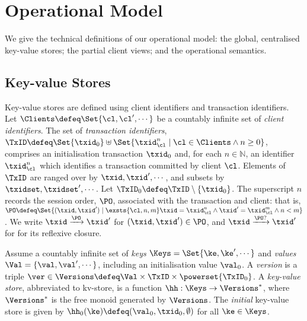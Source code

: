 \section{Operational Model}
\label{sec:model}


We give the technical definitions of our operational model: 
the global, centralised key-value stores; the partial client views;  and the
operational semantics. 

\subsection{Key-value Stores}

Key-value stores are defined using client identifiers and transaction identifiers.
Let $\Clients \defeq \Set{\cl, \cl',\cdots}$ be a 
countably infinite set of \emph{client identifiers}. 
The set of \emph{transaction identifiers}, 
$\TxID \defeq  \Set{\txid_{0}} \uplus \Set{ \txid_{\cl}^{n} \mid \cl
  \in \Clients \wedge n \geq 0 }$, 
comprises an initialisation transaction 
 $\txid_0$ 
 and, for each $n \in \mathbb{N}$, an identifier $\txid_{\cl}^{n}$
which  identifies a transaction 
 committed by client $\cl$. Elements of $\TxID$ are ranged over by
$\txid, \txid', \cdots$, and subsets by $\txidset, \txidset', \cdots$. 
Let $\TxID_{0} \defeq \TxID \setminus \{ \txid_0\}$. 
The superscript $n$ records  the session order, $\PO$, associated with
the transaction and client: that is, 
$\PO \defeq \Set{ (\txid, \txid') \mid \exsts{ \cl, n,m } \txid =
  \txid_{\cl}^{n} \wedge \txid' = \txid_{\cl}^{m} \wedge n < m}$.
We write $\txid \xrightarrow{\PO} \txid'$ for
$(\txid, \txid') \in \PO$, and $\txid \xrightarrow{\PO ?} \txid'$ for
for its reflexive closure. 


\begin{definition}
\label{def:his_heap}
\label{def:mkvs}
Assume a countably infinite set of \emph{keys} $\Keys = \Set{\ke, \ke', \cdots}$
and \emph{values} $\Val = \{\val, \val', \cdots\}$, including an
initialisation value    $\val_0 $.
A \emph{version} is a triple $\ver \in \Versions \defeq \Val \times \TxID \times \powerset{\TxID_{0}}$. 
A \emph{key-value store}, abbreviated to kv-store,  is a function $\hh: \Keys \rightarrow \Versions^{\ast}$, 
where $\Versions^{\ast}$ is the free monoid generated by $\Versions$. 
The \emph{initial}  key-value store is given by 
$\hh_{0}(\ke)\defeq  (\val_0, \txid_0, \emptyset)$ for
all $\ke \in \Keys$.



\end{definition}


